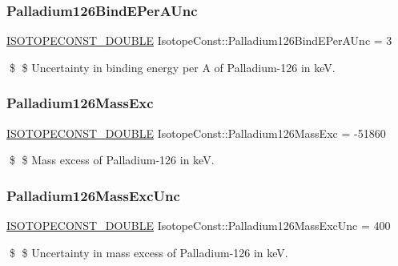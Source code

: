 \subsubsection{\texorpdfstring{Palladium126\+Bind\+E\+Per\+A\+Unc}{Palladium126BindEPerAUnc}}
{\footnotesize\ttfamily \mbox{\hyperlink{group___isotope_const-_macros_ga8f45a7272ce02c0b4c65c44636ed719a}{I\+S\+O\+T\+O\+P\+E\+C\+O\+N\+S\+T\+\_\+\+D\+O\+U\+B\+LE}} Isotope\+Const\+::\+Palladium126\+Bind\+E\+Per\+A\+Unc = 3}

\$ \$ Uncertainty in binding energy per A of Palladium-\/126 in keV. \mbox{\label{group___isotope_const-_palladium-_pd126_gaa7372a80c018b0ea58cbe0d8d39bc891}} 
\subsubsection{\texorpdfstring{Palladium126\+Mass\+Exc}{Palladium126MassExc}}
{\footnotesize\ttfamily \mbox{\hyperlink{group___isotope_const-_macros_ga8f45a7272ce02c0b4c65c44636ed719a}{I\+S\+O\+T\+O\+P\+E\+C\+O\+N\+S\+T\+\_\+\+D\+O\+U\+B\+LE}} Isotope\+Const\+::\+Palladium126\+Mass\+Exc = -\/51860}

\$ \$ Mass excess of Palladium-\/126 in keV. \mbox{\label{group___isotope_const-_palladium-_pd126_gadf8f1621dd8d5362b408309a8fccf8c9}} 
\subsubsection{\texorpdfstring{Palladium126\+Mass\+Exc\+Unc}{Palladium126MassExcUnc}}
{\footnotesize\ttfamily \mbox{\hyperlink{group___isotope_const-_macros_ga8f45a7272ce02c0b4c65c44636ed719a}{I\+S\+O\+T\+O\+P\+E\+C\+O\+N\+S\+T\+\_\+\+D\+O\+U\+B\+LE}} Isotope\+Const\+::\+Palladium126\+Mass\+Exc\+Unc = 400}

\$ \$ Uncertainty in mass excess of Palladium-\/126 in keV. \mbox{\label{group___isotope_const-_palladium-_pd126_ga77ee7b7bf86374cd28c8ed1bb4c79c28}} 
